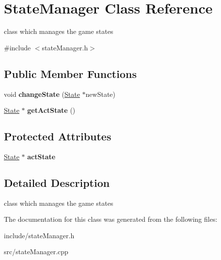 \hypertarget{classStateManager}{
\section{\-State\-Manager \-Class \-Reference}
\label{d4/d5d/classStateManager}
}


class which manages the game states  




{\ttfamily \#include $<$state\-Manager.\-h$>$}

\subsection*{\-Public \-Member \-Functions}
\begin{DoxyCompactItemize}
\item 
\hypertarget{classStateManager_a8258abce82c21d810a2ca054ab8ff0f7}{
void {\bfseries change\-State} (\hyperlink{classState}{\-State} $\ast$new\-State)}
\label{d4/d5d/classStateManager_a8258abce82c21d810a2ca054ab8ff0f7}

\item 
\hypertarget{classStateManager_a7de07ca72ec0c00e4f2ba4f31b47b78c}{
\hyperlink{classState}{\-State} $\ast$ {\bfseries get\-Act\-State} ()}
\label{d4/d5d/classStateManager_a7de07ca72ec0c00e4f2ba4f31b47b78c}

\end{DoxyCompactItemize}
\subsection*{\-Protected \-Attributes}
\begin{DoxyCompactItemize}
\item 
\hypertarget{classStateManager_a8e4af299c433cc04682942d5fa434137}{
\hyperlink{classState}{\-State} $\ast$ {\bfseries act\-State}}
\label{d4/d5d/classStateManager_a8e4af299c433cc04682942d5fa434137}

\end{DoxyCompactItemize}


\subsection{\-Detailed \-Description}
class which manages the game states 

\-The documentation for this class was generated from the following files\-:\begin{DoxyCompactItemize}
\item 
include/state\-Manager.\-h\item 
src/state\-Manager.\-cpp\end{DoxyCompactItemize}
